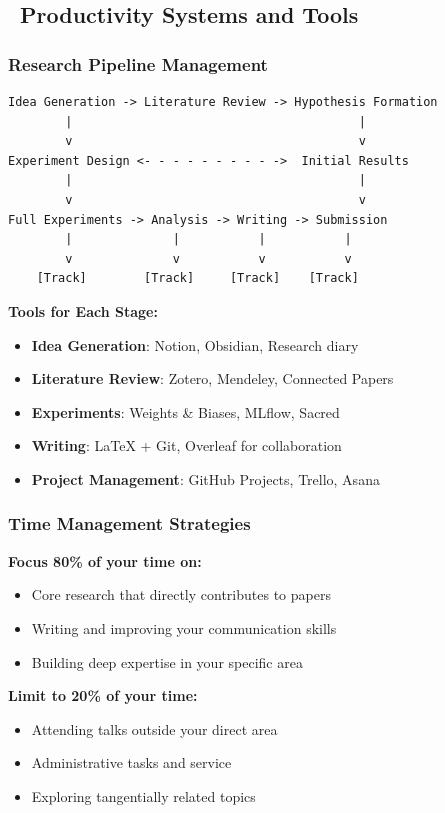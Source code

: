 \documentclass[11pt,a4paper]{article}
\newcommand{\toolitem}{\item[\color{blue!70!black}\faCog]}
\begin{document}
\subsection{\faCogs~Productivity Systems and Tools}

\subsubsection{Research Pipeline Management}

\begin{verbatim}
Idea Generation -> Literature Review -> Hypothesis Formation
        |                                        |
        v                                        v
Experiment Design <- - - - - - - - - ->  Initial Results
        |                                        |
        v                                        v
Full Experiments -> Analysis -> Writing -> Submission
        |              |           |           |
        v              v           v           v
    [Track]        [Track]     [Track]    [Track]
\end{verbatim}

\textbf{Tools for Each Stage:}
\begin{itemize}
    \toolitem \textbf{Idea Generation}: Notion, Obsidian, Research diary
    \toolitem \textbf{Literature Review}: Zotero, Mendeley, Connected Papers
    \toolitem \textbf{Experiments}: Weights \& Biases, MLflow, Sacred
    \toolitem \textbf{Writing}: LaTeX + Git, Overleaf for collaboration
    \toolitem \textbf{Project Management}: GitHub Projects, Trello, Asana
\end{itemize}

\subsubsection{Time Management Strategies}

\begin{tcolorbox}[colback=green!10,colframe=green!50,title=The 80/20 Rule for PhD Productivity]
\textbf{Focus 80\% of your time on:}
\begin{itemize}
    \item Core research that directly contributes to papers
    \item Writing and improving your communication skills
    \item Building deep expertise in your specific area
\end{itemize}

\textbf{Limit to 20\% of your time:}
\begin{itemize}
    \item Attending talks outside your direct area
    \item Administrative tasks and service
    \item Exploring tangentially related topics
\end{itemize}
\end{tcolorbox}
\end{document}
